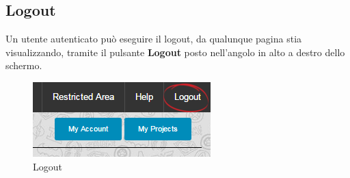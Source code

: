 \subsection{Logout}
Un utente autenticato può eseguire il logout, da qualunque pagina stia visualizzando, tramite il pulsante \textbf{Logout} posto nell'angolo in alto a destro dello schermo.

\begin{figure}[H] 
	\centering 
	\includegraphics[scale=0.80] {img/logout.png}
	\caption{Logout} 
\end{figure}
